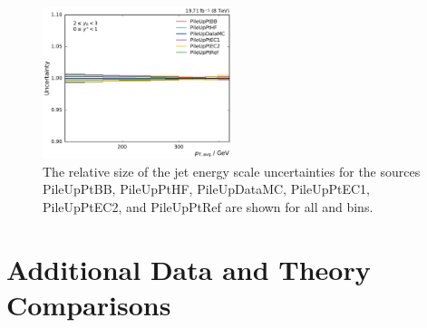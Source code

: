 \begin{figure}[htbp]
    \includegraphics[width=0.49\textwidth]{figures/measurement/jec_relunc_5_yb2ys0.pdf}
    \caption[Split-up of JEC uncertainty sources: Part VI]{The relative size of the jet energy scale
             uncertainties for the sources PileUpPtBB, PileUpPtHF, PileUpDataMC,
             PileUpPtEC1, PileUpPtEC2, and PileUpPtRef are shown for all \ystar and \yboost bins.}
    \label{fig:jec_relunc_5}
\end{figure}


\section{Additional Data and Theory Comparisons}

